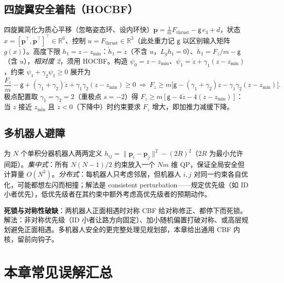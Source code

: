 \subsection{四旋翼安全着陆（HOCBF）}

\begin{example}\label{ex:cbf-quad}
四旋翼简化为质心平移（忽略姿态环、设内环快）$\ddot{\mathbf p}=\tfrac1m F_{\mathrm{thrust}}-\mathsf g\,e_3+d$，状态 $x=[\mathbf p^\top,\dot{\mathbf p}^\top]^\top\in\mathbb R^6$、控制 $u=F_{\mathrm{thrust}}\in\mathbb R^3$（此处重力记 $\mathsf g$ 以区别输入矩阵 $g(x)$）。高度下限 $h_1=z-z_{\min}$：$\dot h_1=\dot z$（不含 $u$，$L_gh_1=0$）、$\ddot h_1=F_z/m-\mathsf g$（含 $u$），\emph{相对度 2}，须用 HOCBF。构造 $\psi_0=z-z_{\min}$、$\psi_1=\dot z+\gamma_1(z-z_{\min})$，约束 $\dot\psi_1+\gamma_2\psi_1\ge0$ 展开为
\[
\frac{F_z}{m}-\mathsf g+(\gamma_1+\gamma_2)\dot z+\gamma_1\gamma_2(z-z_{\min})\ge0\ \Longrightarrow\ F_z\ge m\big[\mathsf g-(\gamma_1+\gamma_2)\dot z-\gamma_1\gamma_2(z-z_{\min})\big].
\]
极点配置取 $\gamma_1=\gamma_2=2$（重极点 $s=-2$）得 $F_z\ge m[\mathsf g-4\dot z-4(z-z_{\min})]$：当 $z$ 接近 $z_{\min}$ 且 $\dot z<0$（下降中）时约束要求 $F_z$ 增大，即加推力减缓下降。
\end{example}

\subsection{多机器人避障}

\begin{example}\label{ex:cbf-multi}
为 $N$ 个单积分器机器人两两定义 $h_{ij}=\|\mathbf p_i-\mathbf p_j\|^2-(2R)^2$（$2R$ 为最小允许间距）\cite{wang2017safety}。\emph{集中式}：所有 $N(N-1)/2$ 约束放入一个 $Nm$ 维 QP，保证全局安全但计算量 $O(N^3)$。\emph{分布式}：每机器人只考虑邻居，但机器人 $i,j$ 对同一约束各自优化，可能都想左闪而相撞；解法是 consistent perturbation——规定优先级（如 ID 小者优先），低优先级者在其约束中额外考虑高优先级者的预期动作。
\end{example}

\textbf{死锁与对称性破缺}：两机器人正面相遇时对称 CBF 给对称修正、都停下而死锁。解法：非对称优先级（ID 小者让路方向固定）、加小随机偏置打破对称、或高层规划避免正面相遇。多机器人安全的更完整处理见规划部，本章给出通用 CBF 内核，留前向钩子。

\section*{本章常见误解汇总}

